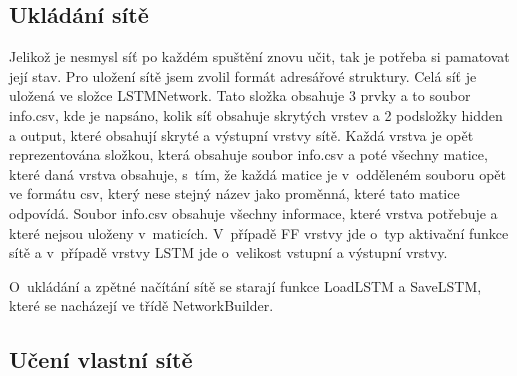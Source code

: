 \documentclass[a4paper]{article}
\begin{document}
\subsection{Ukládání sítě}
Jelikož je nesmysl síť po každém spuštění znovu učit, tak je potřeba si pamatovat její stav. Pro uložení sítě jsem zvolil formát adresářové struktury. Celá síť je uložená ve složce LSTMNetwork. Tato složka obsahuje 3 prvky a to soubor info.csv, kde je napsáno, kolik síť obsahuje skrytých vrstev a 2 podsložky hidden a output, které obsahují skryté a výstupní vrstvy sítě. Každá vrstva je opět reprezentována složkou, která obsahuje soubor info.csv a poté všechny matice, které daná vrstva obsahuje, s~tím, že každá matice je v~odděleném souboru opět ve formátu csv, který nese stejný název jako proměnná, které tato matice odpovídá. Soubor info.csv obsahuje všechny informace, které vrstva potřebuje a které nejsou uloženy v~maticích. V~případě FF vrstvy jde o~typ aktivační funkce sítě a v~případě vrstvy LSTM jde o~velikost vstupní a výstupní vrstvy.\par
O~ukládání a zpětné načítání sítě se starají funkce LoadLSTM a SaveLSTM, které se nacházejí ve třídě NetworkBuilder.
\clearpage
\begin{center}
\section{Učení vlastní sítě}
\end{center}
\end{document}
